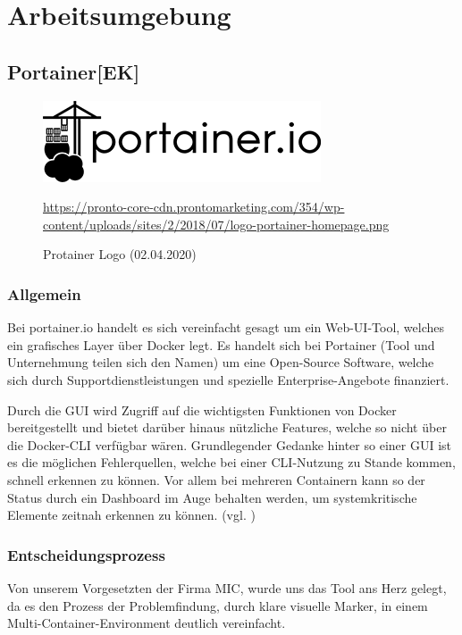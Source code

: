 \section{Arbeitsumgebung}

\subsection{Portainer[EK]}
\begin{figure}[H]
\centering
  \includegraphics[scale=3]{images/protainer-logo.png}
  \caption{Protainer Logo (02.04.2020)}
  \url{https://pronto-core-cdn.prontomarketing.com/354/wp-content/uploads/sites/2/2018/07/logo-portainer-homepage.png}
\end{figure}
\subsubsection{Allgemein}
Bei portainer.io handelt es sich vereinfacht gesagt um ein Web-UI-Tool, welches ein grafisches Layer über Docker legt. Es handelt sich bei Portainer (Tool und Unternehmung teilen sich den Namen) um eine Open-Source Software, welche sich durch Supportdienstleistungen und spezielle Enterprise-Angebote finanziert.
\vspace{5mm}\par
Durch die GUI wird Zugriff auf die wichtigsten Funktionen von Docker bereitgestellt und bietet darüber hinaus nützliche Features, welche so nicht über die Docker-CLI verfügbar wären. Grundlegender Gedanke hinter so einer GUI ist es die möglichen Fehlerquellen, welche bei einer CLI-Nutzung zu Stande kommen, schnell erkennen zu können. Vor allem bei mehreren Containern kann so der Status durch ein Dashboard im Auge behalten werden, um systemkritische Elemente zeitnah erkennen zu können.
(vgl. \cite{Portainer})
\subsubsection{Entscheidungsprozess}
Von unserem Vorgesetzten der Firma MIC, wurde uns das Tool ans Herz gelegt, da es den Prozess der Problemfindung, durch klare visuelle Marker, in einem Multi-Container-Environment deutlich vereinfacht. 

